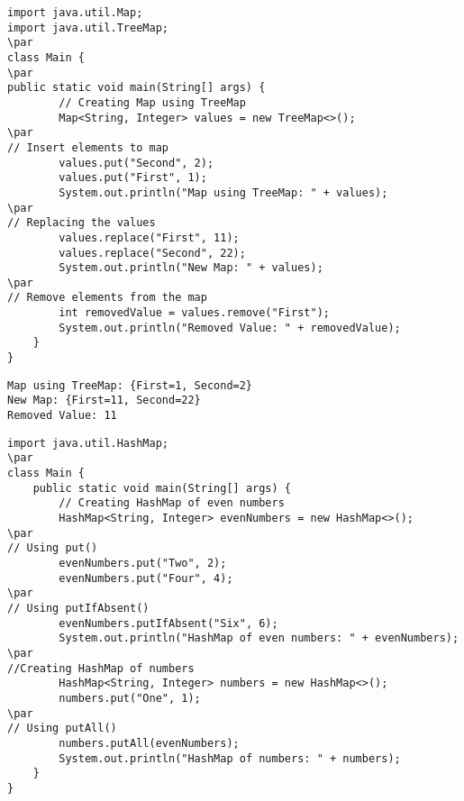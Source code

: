 \documentclass{book}
\def\lthtmlcheckvsize{\ifdim\ht\sizebox<\vsize 
  \ifdim\wd\sizebox<\hsize\expandafter\hfill\fi \expandafter\vfill
  \else\expandafter\vss\fi}%
\begin{document}
{\newpage\clearpage
{}%
\begin{lstlisting}
import java.util.Map;
import java.util.TreeMap;
\par
class Main {
\par
public static void main(String[] args) {
        // Creating Map using TreeMap
        Map<String, Integer> values = new TreeMap<>();
\par
// Insert elements to map
        values.put("Second", 2);
        values.put("First", 1);
        System.out.println("Map using TreeMap: " + values);
\par
// Replacing the values
        values.replace("First", 11);
        values.replace("Second", 22);
        System.out.println("New Map: " + values);
\par
// Remove elements from the map
        int removedValue = values.remove("First");
        System.out.println("Removed Value: " + removedValue);
    }
}
\end{lstlisting}%
\lthtmlfigureZ
\lthtmlcheckvsize\clearpage}

{\newpage\clearpage
{}%
\begin{lstlisting}
Map using TreeMap: {First=1, Second=2}
New Map: {First=11, Second=22}
Removed Value: 11
\end{lstlisting}%
\lthtmlfigureZ
\lthtmlcheckvsize\clearpage}

{\newpage\clearpage
{}%
\begin{lstlisting}
import java.util.HashMap;
\par
class Main {
    public static void main(String[] args) {
        // Creating HashMap of even numbers
        HashMap<String, Integer> evenNumbers = new HashMap<>();
\par
// Using put()
        evenNumbers.put("Two", 2);
        evenNumbers.put("Four", 4);
\par
// Using putIfAbsent()
        evenNumbers.putIfAbsent("Six", 6);
        System.out.println("HashMap of even numbers: " + evenNumbers);
\par
//Creating HashMap of numbers
        HashMap<String, Integer> numbers = new HashMap<>();
        numbers.put("One", 1);
\par
// Using putAll()
        numbers.putAll(evenNumbers);
        System.out.println("HashMap of numbers: " + numbers);
    }
}
\end{lstlisting}%
\lthtmlfigureZ
\lthtmlcheckvsize\clearpage}
\end{document}
